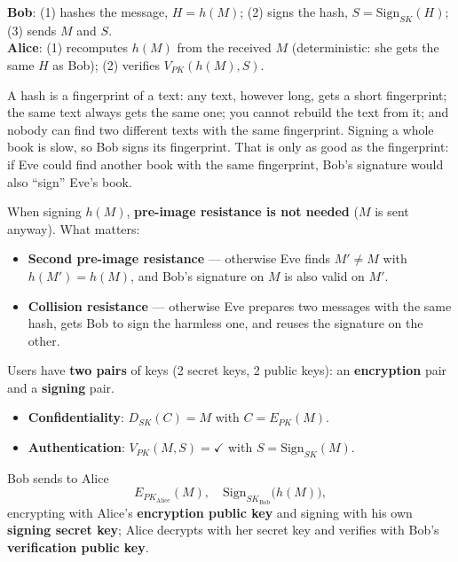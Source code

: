 \begin{algbox}[title={Signing a hash, step by step}]
\textbf{Bob}: (1) hashes the message, $H = h(M)$; (2) signs the hash, $S = \mathrm{Sign}_{SK}(H)$;
(3) sends $M$ and $S$. \\
\textbf{Alice}: (1) recomputes $h(M)$ from the received $M$ (deterministic: she gets the same $H$
as Bob); (2) verifies $V_{PK}(h(M), S)$.
\end{algbox}

\begin{goatbox}
A hash is a fingerprint of a text: any text, however long, gets a short fingerprint; the same text
always gets the same one; you cannot rebuild the text from it; and nobody can find two different
texts with the same fingerprint. Signing a whole book is slow, so Bob signs its fingerprint. That
is only as good as the fingerprint: if Eve could find another book with the same fingerprint,
Bob's signature would also ``sign'' Eve's book.
\end{goatbox}

\begin{propbox}[title=Which hash properties do signatures need?]
When signing $h(M)$, \textbf{pre-image resistance is not needed} ($M$ is sent anyway).
What matters:
\begin{itemize}
  \item \textbf{Second pre-image resistance} --- otherwise Eve finds $M' \neq M$ with
        $h(M') = h(M)$, and Bob's signature on $M$ is also valid on $M'$.
  \item \textbf{Collision resistance} --- otherwise Eve prepares two messages with the same
        hash, gets Bob to sign the harmless one, and reuses the signature on the other.
\end{itemize}
\end{propbox}

\begin{defnbox}[title={All together: asymmetric confidentiality and authentication}]
Users have \textbf{two pairs} of keys (2 secret keys, 2 public keys): an
\textbf{encryption} pair and a \textbf{signing} pair.
\begin{itemize}
  \item \textbf{Confidentiality}: $D_{SK}(C) = M$ with $C = E_{PK}(M)$.
  \item \textbf{Authentication}: $V_{PK}(M, S) = \checkmark$ with
        $S = \mathrm{Sign}_{SK}(M)$.
\end{itemize}
Bob sends to Alice
\[
  E_{PK_{\text{Alice}}}(M), \quad \mathrm{Sign}_{SK_{\text{Bob}}}\big(h(M)\big),
\]
encrypting with Alice's \textbf{encryption public key} and signing with his own
\textbf{signing secret key}; Alice decrypts with her secret key and verifies with Bob's
\textbf{verification public key}.
\end{defnbox}

